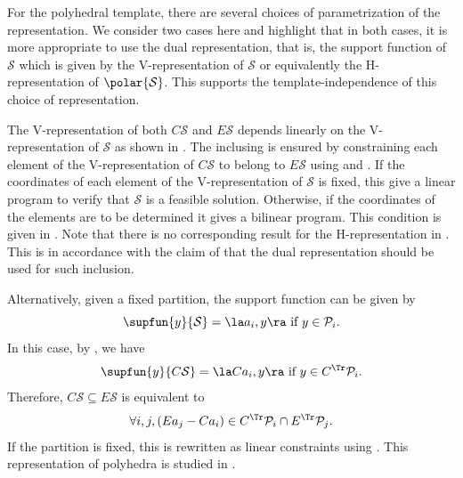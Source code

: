 \documentclass[11pt,twoside,a4paper,openright]{uclouvain-thesis}
\begin{document}
\begin{myexem}
  For the polyhedral template, there are several choices of parametrization of the
  representation.
  We consider two cases here and highlight that in both cases,
  it is more appropriate to use the dual representation,
  that is, the support function of $\mathcal{S}$ which is given by the
  V-representation of $\mathcal{S}$ or equivalently the H-representation of
  $\polar{\mathcal{S}}$.
  This supports the template-independence of this choice of representation.

  The V-representation of both $C\mathcal{S}$ and $E\mathcal{S}$ depends linearly on the V-representation of $\mathcal{S}$ as shown in .
  The inclusing is ensured by constraining each element of the V-representation
  of $C\mathcal{S}$ to belong to $E\mathcal{S}$ using  and .
  If the coordinates of each element of the V-representation of $\mathcal{S}$ is fixed,
  this give a linear program to verify that $\mathcal{S}$ is a feasible solution.
  Otherwise, if the coordinates of the elements are to be determined
  it gives a bilinear program.
  This condition is given in \cite[Theorem~4.44]{blanchini2015set}.
  Note that there is no corresponding result for the H-representation in \cite{blanchini2015set}.
  This is in accordance with the claim of  that the dual representation
  should be used for such inclusion.

  Alternatively, given a fixed partition, the support function can be given by
  \[
    \supfun{y}{\mathcal{S}} =
    \la a_i, y \ra \text{ if } y \in \mathcal{P}_i.
  \]
  In this case, by , we have
  \[
    \supfun{y}{C\mathcal{S}} =
    \la C a_i, y \ra \text{ if } y \in C^\Tr \mathcal{P}_i.
  \]
  Therefore, $C\mathcal{S} \subseteq E\mathcal{S}$ is equivalent to
  \[ \forall i, j, (E a_j - C a_i) \in C^\Tr \mathcal{P}_i \cap E^\Tr \mathcal{P}_j. \]
  If the partition is fixed, this is rewritten as linear constraints using .
  This representation of polyhedra is studied in \cite{rakovic2020robust}.
\end{myexem}
\end{document}
